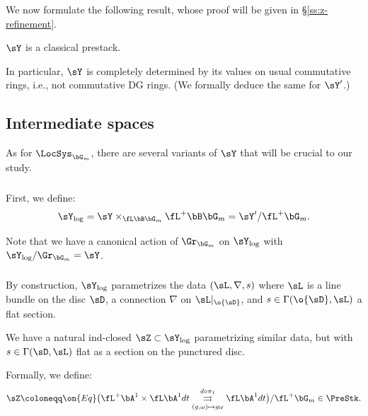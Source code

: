 \subsubsection{}

We now formulate the following result, whose proof will
be given in \S \ref{ss:z-refinement}.

\begin{thm}
\notready\label{t:cl}

$\sY$ is a classical prestack.

\end{thm}

In particular, $\sY$ is completely determined by its values
on usual commutative rings, i.e., not commutative DG rings.
(We formally deduce the same for $\sY^{\prime}$.)

\subsection{Intermediate spaces}\label{ss:y-trun}

As for $\LocSys_{\bG_m}$, there are several variants of
$\sY$ that will be crucial to our
study.

\subsubsection{}

First, we define:
%
\[
\sY_{\log} = \sY \times_{\fL \bB\bG_m} \fL^+ \bB \bG_m =
\sY^{\prime}/\fL^+\bG_m.
\]

Note that we have a canonical action of $\Gr_{\bG_m}$ on
$\sY_{\log}$ with $\sY_{\log}/\Gr_{\bG_m} = \sY$.

\subsubsection{}

By construction, $\sY_{\log}$ parametrizes the data
$(\sL,\nabla,s)$ where $\sL$ is a line bundle
on the disc $\sD$,
a connection $\nabla$ on $\sL|_{\o{\sD}}$, and
$s \in \Gamma(\o{\sD},\sL)$ a flat section.

We have a natural ind-closed $\sZ \subset \sY_{\log}$ parametrizing
similar data, but with $s \in \Gamma(\sD,\sL)$ flat as a
section on the punctured disc.

Formally, we define:
%
\[
\sZ \coloneqq \on{Eq}
\big(\fL^+ \bA^1 \times \fL \bA^1 dt
\underset{(g,\omega) \mapsto g\omega}{\overset{d\circ \pi_1}{\rightrightarrows}}
\fL \bA^1 dt\big)/\fL^+ \bG_m \in \PreStk.
\]

